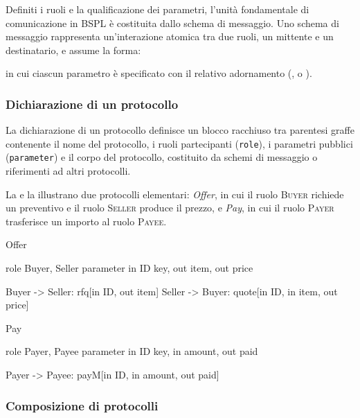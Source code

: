 Definiti i ruoli e la qualificazione dei parametri, l'unità fondamentale di 
comunicazione in BSPL è costituita dallo schema di messaggio.
Uno schema di messaggio rappresenta un'interazione atomica tra due ruoli, un mittente e un 
destinatario, e assume la forma:
\begin{center}
\end{center}
in cui ciascun parametro è specificato con il relativo adornamento (, 
 o ).

\subsubsection{Dichiarazione di un protocollo}\label{bspl:dichiarazione-protocollo}

La dichiarazione di un protocollo definisce un blocco racchiuso tra parentesi graffe contenente 
il nome del protocollo, i ruoli partecipanti (\texttt{role}), i parametri pubblici (\texttt{parameter}) 
e il corpo del protocollo, costituito da schemi di messaggio o riferimenti ad altri protocolli.

La  e la  illustrano due protocolli elementari: 
\emph{Offer}, in cui il ruolo \textsc{Buyer} richiede un preventivo e il ruolo \textsc{Seller} 
produce il prezzo, e \emph{Pay}, in cui il ruolo \textsc{Payer} trasferisce un importo al ruolo \textsc{Payee}.

\begin{bspllisting}[caption={Dichiarazione del protocollo Offer in BSPL.}, label={lst:bspl_offer}]
Offer {
    role Buyer, Seller
    parameter in ID key, out item, out price

    Buyer -> Seller: rfq[in ID, out item]
    Seller -> Buyer: quote[in ID, in item, out price]
}
\end{bspllisting}

\begin{bspllisting}[caption={Dichiarazione del protocollo Pay in BSPL.}, label={lst:bspl_pay}]
Pay {
    role Payer, Payee
    parameter in ID key, in amount, out paid

    Payer -> Payee: payM[in ID, in amount, out paid]
}
\end{bspllisting}

\subsubsection{Composizione di protocolli}\label{bspl:composizione}

